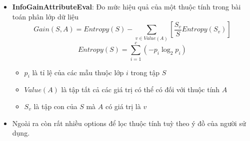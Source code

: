 \documentclass[a4paper, 12pt]{article}
\begin{document}
\begin{itemize}
\begin{itemize}
        \item \textbf{InfoGainAttributeEval}: Đo mức hiệu quả của một thuộc tính trong bài toán phân lớp dữ liệu 
        $$Gain(S, A) = Entropy(S) - \sum_{v \in Value(A)} [\frac{S_v}{S}Entropy(S_v)]$$ $$Entropy(S) = \sum_{i = 1}^{c} (-p_i \log_2 p_i)$$
        \begin{itemize}
            \item $p_i$ là tỉ lệ của các mẫu thuộc lớp $i$ trong tập $S$
            \item $Value(A)$ là tập tất cả các giá trị có thể có đối với thuộc tính $A$
            \item $S_v$ là tập con của $S$ mà $A$ có giá trị là $v$
        \end{itemize}

        \item Ngoài ra còn rất nhiều options để lọc thuộc tính tuỳ theo ý đồ của người sử dụng.
    \end{itemize}


\end{itemize}
\end{document}
